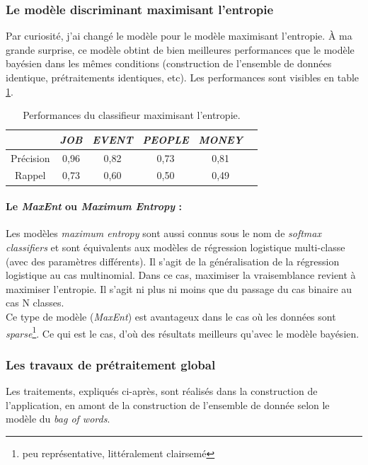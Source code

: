             \subsubsection{Le modèle discriminant maximisant l'entropie}
                Par curiosité, j'ai changé le modèle pour le modèle maximisant l'entropie. À ma grande surprise, ce modèle obtint de bien meilleures performances que le modèle bayésien dans les mêmes conditions (construction de l'ensemble de données identique, prétraitements identiques, etc). Les performances sont visibles en table \ref{tab:classif_perf3}.
                \begin{table}[h]
                    \centering
                    \begin{tabular}{| c | c | c | c | c | c |}
                        \hline
                         & \textit{JOB} & \textit{EVENT} & \textit{PEOPLE} & \textit{MONEY} \\
                        \hline
                        Précision & 0,96 & 0,82 & 0,73 & 0,81 \\
                        Rappel & 0,73 & 0,60 & 0,50 & 0,49 \\
                        \hline
                    \end{tabular}
                    \caption{Performances du classifieur maximisant l'entropie.}
                    \label{tab:classif_perf3}
                \end{table}

                \paragraph{Le \textit{MaxEnt} ou \textit{Maximum Entropy} :}
                    Les modèles \textit{maximum entropy} sont aussi connus sous le nom de \textit{softmax classifiers} et sont équivalents aux modèles de régression logistique multi-classe (avec des paramètres différents). Il s'agit de la généralisation de la régression logistique au cas multinomial. Dans ce cas, maximiser la vraisemblance revient à maximiser l'entropie. Il s'agit ni plus ni moins que du passage du cas binaire au cas N classes.\\
                    Ce type de modèle  (\textit{MaxEnt}) est avantageux dans le cas où les données sont \textit{sparse}\footnote{peu représentative, littéralement \og clairsemé \fg}. Ce qui est le cas, d'où des résultats meilleurs qu'avec le modèle bayésien.

            \subsubsection{Les travaux de prétraitement global}
            \label{ssubsec:travaux_globaux}
                Les traitements, expliqués ci-après, sont réalisés dans la construction de l'application, en amont de la construction de l'ensemble de donnée selon le modèle du \textit{bag of words}.

